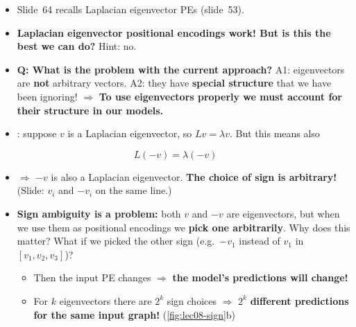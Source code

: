 \begin{itemize}
  \item Slide~64 recalls Laplacian eigenvector PEs (slide~53).
  \item \textbf{Laplacian eigenvector positional encodings work! But is this the
    best we can do?} Hint: no.
  \item \textbf{Q: What is the problem with the current approach?} A1:
    eigenvectors are \textbf{not} arbitrary vectors. A2: they have
    \textbf{special structure} that we have been ignoring!
    $\Rightarrow$ \textbf{To use eigenvectors properly we must account for their
    structure in our models.}
  \item {}: suppose $v$ is a Laplacian
    eigenvector, so $Lv=\lambda v$. But this means also
\end{itemize}
\begin{equation}\label{eq:lec08-sign}
  L(-v) = \lambda(-v)
\end{equation}
\begin{itemize}
  \item[] $\Rightarrow$ $-v$ is also a Laplacian eigenvector. \textbf{The choice
    of sign is arbitrary!} (Slide: $v_i$ and $-v_i$ on the same line.)
  \item \textbf{Sign ambiguity is a problem:} both $v$ and $-v$ are
    eigenvectors, but when we use them as positional encodings we \textbf{pick
    one arbitrarily}. Why does this matter? What if we picked the other sign
    (e.g.\ $-v_1$ instead of $v_1$ in $[v_1,v_2,v_3]$)?
    \begin{itemize}
      \item Then the input PE changes $\Rightarrow$ \textbf{the model's
        predictions will change!}
      \item For $k$ eigenvectors there are $2^k$ sign choices $\Rightarrow$
        $2^k$ \textbf{different predictions for the same input graph!}
        (\cref{fig:lec08-sign}b)
    \end{itemize}
\end{itemize}

